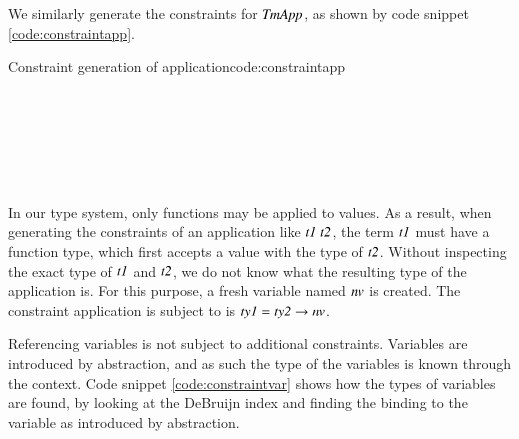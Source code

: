 We similarly generate the constraints for \ensuremath{\Conid{TmApp}}, as shown by code snippet \ref{code:constraintapp}.
\begin{texexptitled}{Constraint generation of application}{code:constraintapp}
\begin{hscode}\SaveRestoreHook
{}%
%
%
%
%
%
\>[5]{}\;\;\to {}\<[E]%
\\
\>[5]{}\<[9]%
\>[9]{}\;{}\<[13]%
\>[13]{}\<[21]%
\>[21]{}\leftarrow{}\;\<[E]%
\\
\>[13]{}\<[21]%
\>[21]{}\leftarrow{}\;\<[E]%
\\
\>[13]{}\<[21]%
\>[21]{}\leftarrow{}\<[E]%
\\
\>[13]{}\<[E]%
\\
\>[13]{}\;\<[E]%
\ColumnHook
\end{hscode}\resethooks
\end{texexptitled}

In our type system, only functions may be applied to values.
As a result, when generating the constraints of an application like \ensuremath{\Varid{t1}\;\Varid{t2}}, the term \ensuremath{\Varid{t1}} must have a function type, which first accepts a value with the type of \ensuremath{\Varid{t2}}.
Without inspecting the exact type of \ensuremath{\Varid{t1}} and \ensuremath{\Varid{t2}}, we do not know what the resulting type of the application is.
For this purpose, a fresh variable named \ensuremath{\Varid{nv}} is created.
The constraint application is subject to is \ensuremath{\Varid{ty1}\mathrel{=}\Varid{ty2}\to \Varid{nv}}.

Referencing variables is not subject to additional constraints.
Variables are introduced by abstraction, and as such the type of the variables is known through the context.
Code snippet \ref{code:constraintvar} shows how the types of variables are found, by looking at the DeBruijn index and finding the binding to the variable as introduced by abstraction.

